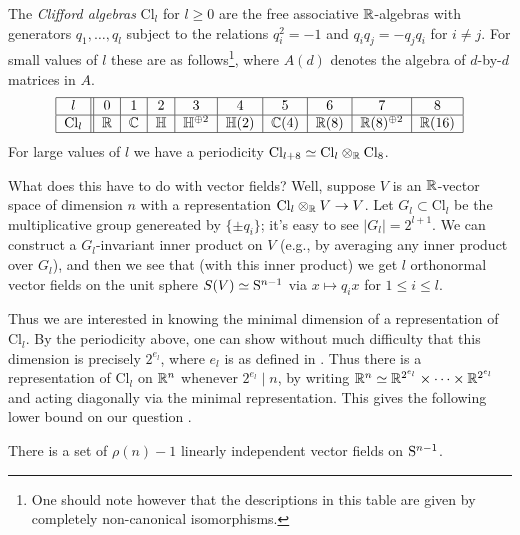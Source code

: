 \newcommand{\Cl}{\mathrm{Cl}}
\newcommand{\HH}{\mathbb{H}}
\begin{nothing}
  \label{clifford}
  The \emph{Clifford algebras} $\Cl_l$ for $l \ge 0$ are the free
  associative $\R$-algebras with generators $q_1,\ldots,q_l$ subject
  to the relations $q_i^2 = -1$ and $q_iq_j = -q_jq_i$ for $i \ne
  j$. For small values of $l$ these are as follows\footnote{One should
    note however that the descriptions in this table are given by
    completely non-canonical isomorphisms.}, where $A(d)$
  denotes the algebra of $d$-by-$d$ matrices in $A$.
  \[
    \begin{tabular}{|c||c|c|c|c|c|c|c|c|c|}
      \hline
      $l$ & 0 & 1 & 2 & 3 & 4 & 5 & 6 & 7 & 8 \\
      \hline
      $\Cl_l$ & $\R$ & $\C$ & $\HH$ & $\HH^{\oplus 2}$ & $\HH(2)$ &
      $\C(4)$ & $\R(8)$ & $\R(8)^{\oplus 2}$ & $\R(16)$ \\
      \hline
    \end{tabular}
  \]
  For large values of $l$ we have a periodicity $\Cl_{l+8} \simeq
  \Cl_l \otimes_\R \Cl_8$.

  What does this have to do with vector fields? Well, suppose $V$ is
  an $\R$-vector space of dimension $n$ with a representation $\Cl_l
  \otimes_\R V \to V$. Let $G_l \subset \Cl_l$ be the multiplicative
  group genereated by $\{\pm q_i\}$; it's easy to see $|G_l| =
  2^{l+1}$. We can construct a $G_l$-invariant inner product on $V$
  (e.g., by averaging any inner product over $G_l$), and then we see
  that (with this inner product) we get $l$ orthonormal vector fields
  on the unit sphere $S(V) \simeq \S^{n-1}$ via $x \mapsto q_ix$ for
  $1 \le i \le l$.

  Thus we are interested in knowing the minimal dimension of a
  representation of $\Cl_l$. By the periodicity above, one can show
  without much difficulty that this dimension is precisely $2^{e_l}$,
  where $e_l$ is as defined in . Thus there is a
  representation of $\Cl_l$ on $\R^n$ whenever $2^{e_l} \mid n$, by
  writing $\R^n \simeq \R^{2^{e_l}} \times \cdots \times \R^{2^{e_l}}$
  and acting diagonally via the minimal representation. This gives the
  following lower bound on our question .
\end{nothing}

\begin{theorem}
  \label{vfield-lower-bound}
  There is a set of $\rho(n)-1$ linearly independent vector fields on
  $\S^{n-1}$.
\end{theorem}

